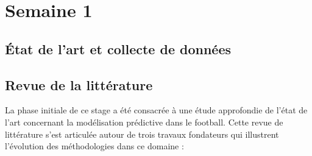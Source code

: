 \chapter{Semaine 1}
\section{État de l'art et collecte de données}


\section{Revue de la littérature}
La phase initiale de ce stage a été consacrée à une étude approfondie de l'état 
de l'art concernant la modélisation prédictive dans le football. Cette revue de 
littérature s'est articulée autour de trois travaux fondateurs qui illustrent 
l'évolution des méthodologies dans ce domaine :

